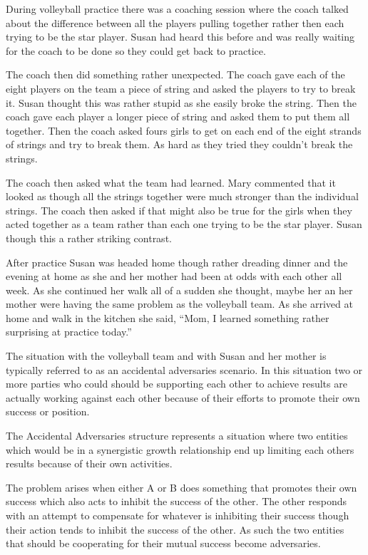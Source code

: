 \documentclass[]{memoir}
\begin{document}
During volleyball practice there was a coaching session where the coach
talked about the difference between all the players pulling together
rather then each trying to be the star player. Susan had heard this
before and was really waiting for the coach to be done so they could get
back to practice.

The coach then did something rather unexpected. The coach gave each of
the eight players on the team a piece of string and asked the players to
try to break it. Susan thought this was rather stupid as she easily
broke the string. Then the coach gave each player a longer piece of
string and asked them to put them all together. Then the coach asked
fours girls to get on each end of the eight strands of strings and try
to break them. As hard as they tried they couldn't break the strings.

The coach then asked what the team had learned. Mary commented that it
looked as though all the strings together were much stronger than the
individual strings. The coach then asked if that might also be true for
the girls when they acted together as a team rather than each one trying
to be the star player. Susan though this a rather striking contrast.

After practice Susan was headed home though rather dreading dinner and
the evening at home as she and her mother had been at odds with each
other all week. As she continued her walk all of a sudden she thought,
maybe her an her mother were having the same problem as the volleyball
team. As she arrived at home and walk in the kitchen she said, ``Mom, I
learned something rather surprising at practice today.''

The situation with the volleyball team and with Susan and her mother is
typically referred to as an accidental adversaries scenario. In this
situation two or more parties who could should be supporting each other
to achieve results are actually working against each other because of
their efforts to promote their own success or position.

The Accidental Adversaries structure represents a situation where two
entities which would be in a synergistic growth relationship end up
limiting each others results because of their own activities.

The problem arises when either A or B does something that promotes their
own success which also acts to inhibit the success of the other. The
other responds with an attempt to compensate for whatever is inhibiting
their success though their action tends to inhibit the success of the
other. As such the two entities that should be cooperating for their
mutual success become adversaries.
\end{document}
